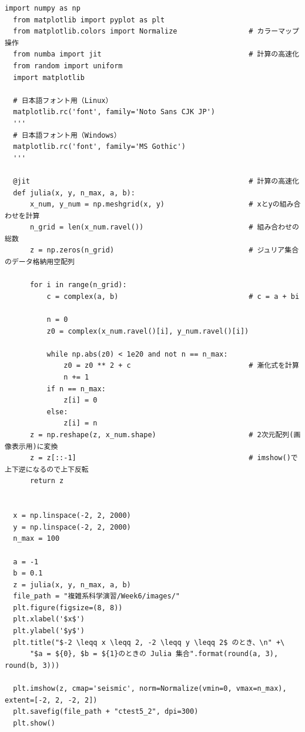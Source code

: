 \begin{lstlisting}[caption=julia.py]
  import numpy as np
  from matplotlib import pyplot as plt
  from matplotlib.colors import Normalize                 # カラーマップ操作
  from numba import jit                                   # 計算の高速化
  from random import uniform
  import matplotlib

  # 日本語フォント用（Linux）
  matplotlib.rc('font', family='Noto Sans CJK JP')
  '''
  # 日本語フォント用（Windows）
  matplotlib.rc('font', family='MS Gothic')
  '''

  @jit                                                    # 計算の高速化
  def julia(x, y, n_max, a, b):
      x_num, y_num = np.meshgrid(x, y)                    # xとyの組み合わせを計算
      n_grid = len(x_num.ravel())                         # 組み合わせの総数
      z = np.zeros(n_grid)                                # ジュリア集合のデータ格納用空配列

      for i in range(n_grid):
          c = complex(a, b)                               # c = a + bi

          n = 0
          z0 = complex(x_num.ravel()[i], y_num.ravel()[i])

          while np.abs(z0) < 1e20 and not n == n_max:
              z0 = z0 ** 2 + c                            # 漸化式を計算
              n += 1
          if n == n_max:
              z[i] = 0
          else:
              z[i] = n
      z = np.reshape(z, x_num.shape)                      # 2次元配列(画像表示用)に変換
      z = z[::-1]                                         # imshow()で上下逆になるので上下反転
      return z


  x = np.linspace(-2, 2, 2000)
  y = np.linspace(-2, 2, 2000)
  n_max = 100

  a = -1
  b = 0.1
  z = julia(x, y, n_max, a, b)
  file_path = "複雑系科学演習/Week6/images/"
  plt.figure(figsize=(8, 8))
  plt.xlabel('$x$')
  plt.ylabel('$y$')
  plt.title("$-2 \leqq x \leqq 2, -2 \leqq y \leqq 2$ のとき、\n" +\
      "$a = ${0}, $b = ${1}のときの Julia 集合".format(round(a, 3), round(b, 3)))

  plt.imshow(z, cmap='seismic', norm=Normalize(vmin=0, vmax=n_max), extent=[-2, 2, -2, 2])
  plt.savefig(file_path + "ctest5_2", dpi=300)
  plt.show()
\end{lstlisting}

\newpage
